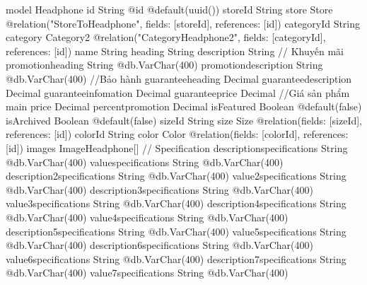 model Headphone {
  id                            String                          @id @default(uuid())
  storeId                       String
  store                         Store                           @relation("StoreToHeadphone", fields: [storeId], references: [id])
  categoryId           String
  category             Category2                       @relation("CategoryHeadphone2", fields: [categoryId], references: [id])
  name                          String
  heading                       String
  description                   String
  // Khuyến mãi
  promotionheading              String                          @db.VarChar(400)
  promotiondescription          String                          @db.VarChar(400)
  //Bảo hành
  guaranteeheading              Decimal
  guaranteedescription          Decimal
  guaranteeinfomation           Decimal
  guaranteeprice                Decimal
  //Giá sản phẩm main
  price                         Decimal
  percentpromotion              Decimal
  isFeatured                    Boolean                         @default(false)
  isArchived                    Boolean                         @default(false)
  sizeId                        String
  size                          Size                            @relation(fields: [sizeId], references: [id])
  colorId                       String
  color                         Color                           @relation(fields: [colorId], references: [id])
  images               ImageHeadphone[]
  // Specification
  descriptionspecifications     String                          @db.VarChar(400)
  valuespecifications           String                          @db.VarChar(400)
  description2specifications    String                          @db.VarChar(400)
  value2specifications          String                          @db.VarChar(400)
  description3specifications    String                          @db.VarChar(400)
  value3specifications          String                          @db.VarChar(400)
  description4specifications    String                          @db.VarChar(400)
  value4specifications          String                          @db.VarChar(400)
  description5specifications    String                          @db.VarChar(400)
  value5specifications          String                          @db.VarChar(400)
  description6specifications    String                          @db.VarChar(400)
  value6specifications          String                          @db.VarChar(400)
  description7specifications    String                          @db.VarChar(400)
  value7specifications          String                          @db.VarChar(400)
}

